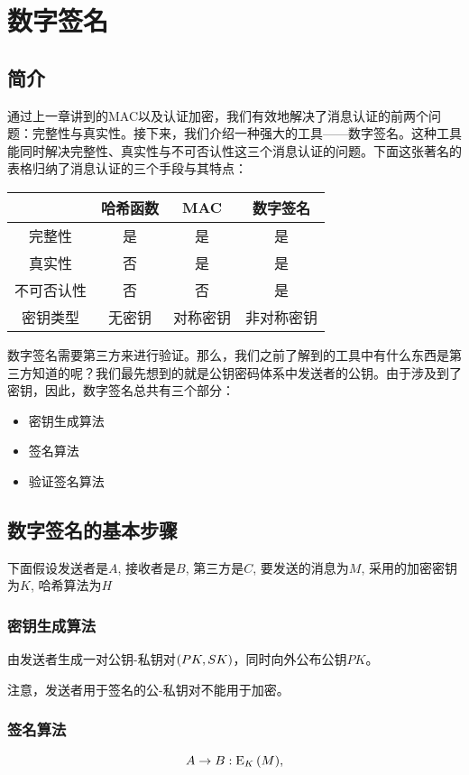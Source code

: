\chapter{数字签名}
\section{简介}
通过上一章讲到的MAC以及认证加密，我们有效地解决了消息认证的前两个问题：完整性与真实性。接下来，我们介绍一种强大的工具——数字签名。这种工具能同时解决完整性、真实性与不可否认性这三个消息认证的问题。下面这张著名的表格归纳了消息认证的三个手段与其特点：
\begin{table}[H]
    \centering
    \begin{tabular}{c|c|c|c}\hline
        &哈希函数&MAC&数字签名\\\hline
        完整性&是&是&是\\\hline
        真实性&否&是&是\\\hline
        不可否认性&否&否&是\\\hline
        密钥类型&无密钥&对称密钥&非对称密钥\\\hline
    \end{tabular}
\end{table}

数字签名需要第三方来进行验证。那么，我们之前了解到的工具中有什么东西是第三方知道的呢？我们最先想到的就是公钥密码体系中发送者的公钥。由于涉及到了密钥，因此，数字签名总共有三个部分：
\begin{itemize}
    \item 密钥生成算法
    \item 签名算法
    \item 验证签名算法
\end{itemize}
\section{数字签名的基本步骤}
下面假设发送者是$A$, 接收者是$B$, 第三方是$C$, 要发送的消息为$M$, 采用的加密密钥为$K$, 哈希算法为$H$
\subsection{密钥生成算法}
由发送者生成一对公钥-私钥对$\left( {PK, SK}\right)$，同时向外公布公钥$PK$。\par
注意，发送者用于签名的公-私钥对不能用于加密。
\subsection{签名算法}
\[A\to B:{\mathrm{E}_{K}\left({M}\right)},\]

